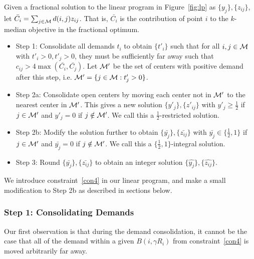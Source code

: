 Given a fractional solution to the linear program in Figure~\ref{fig:lp} as $\{y_j\}, \{z_{ij}\}$, let $\bar{C_i} = \sum_{j \in \mathcal{M}} d(i, j) z_{ij}$. That is, $\bar{C_i}$ is the contribution of point $i$ to the $k$-median objective in the fractional optimum.
\begin{itemize}
  \item Step 1: Consolidate all demands $t_i$ to obtain $\{t'_i\}$ such that for all $i, j \in \mathcal{M}$ with $t'_i > 0, t'_j > 0$, they must be sufficiently far away such that $c_{ij}>4\max(\bar{C_i},\bar{C_j})$. Let $\mathcal{M}'$ be the set of centers with positive demand after this step, i.e. $\mathcal{M}' = \{j \in \mathcal{M}: t'_j > 0\}$.
  \item Step 2a: Consolidate open centers by moving each center not in $\mathcal{M}'$ to the nearest center in $\mathcal{M}'$. This gives a new solution $\{y'_j\}, \{z'_{ij}\}$ with $y'_j \geq \frac{1}{2}$ if $j \in \mathcal{M}'$ and $y'_j = 0$ if $j \notin \mathcal{M}'$. We call this a $\frac{1}{2}$-restricted solution.
  \item Step 2b: Modify the solution further to obtain $\{ \bar{y_j} \}, \{ \bar{z_{ij}} \}$ with $\bar{y_j} \in \{ \frac{1}{2}, 1 \}$ if $j \in \mathcal{M}'$ and $\bar{y_j} = 0$ if $j \notin \mathcal{M}'$. We call this a $\lbrace \frac{1}{2},1 \rbrace$-integral solution.
  \item Step 3: Round $\{ \bar{y_j} \}, \{ \bar{z_{ij}} \}$ to obtain an integer solution $\{ \hat{y_j} \}, \{ \hat{z_{ij}} \}$.
\end{itemize}

We introduce constraint~\ref{con4} in our linear program, and make a small modification to Step 2b as described in sections below.

\subsubsection{Step 1: Consolidating Demands}
Our first observation is that during the demand consolidation, it cannot be the case that all of the demand within a given $B(i, \gamma R_i)$ from constraint~\ref{con4} is moved arbitrarily far away.

